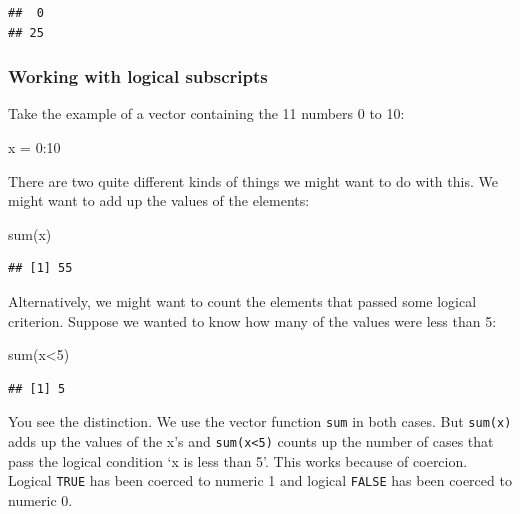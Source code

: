 \documentclass[
]{book}
\newenvironment{Shaded}{\begin{snugshade}}{\end{snugshade}}
\newcommand{\DecValTok}[1]{\textcolor[rgb]{0.00,0.00,0.81}{#1}}
\newcommand{\FunctionTok}[1]{\textcolor[rgb]{0.00,0.00,0.00}{#1}}
\newcommand{\NormalTok}[1]{#1}
\newcommand{\OtherTok}[1]{\textcolor[rgb]{0.56,0.35,0.01}{#1}}
\newcommand{\SpecialCharTok}[1]{\textcolor[rgb]{0.00,0.00,0.00}{#1}}
\theoremstyle{definition}
\theoremstyle{definition}
\theoremstyle{definition}
\theoremstyle{definition}
\theoremstyle{remark}
\begin{document}
\begin{verbatim}
##  0 
## 25
\end{verbatim}

\hypertarget{working-with-logical-subscripts}{%
\subsubsection{Working with logical subscripts}\label{working-with-logical-subscripts}}

Take the example of a vector containing the 11 numbers 0 to 10:

\begin{Shaded}
\begin{Highlighting}[]
\NormalTok{x }\OtherTok{=} \DecValTok{0}\SpecialCharTok{:}\DecValTok{10}
\end{Highlighting}
\end{Shaded}

There are two quite different kinds of things we might want to do with this. We might want to add up the values of the elements:

\begin{Shaded}
\begin{Highlighting}[]
\FunctionTok{sum}\NormalTok{(x)}
\end{Highlighting}
\end{Shaded}

\begin{verbatim}
## [1] 55
\end{verbatim}

Alternatively, we might want to count the elements that passed some logical criterion. Suppose we wanted to know how many of the values were less than 5:

\begin{Shaded}
\begin{Highlighting}[]
\FunctionTok{sum}\NormalTok{(x}\SpecialCharTok{\textless{}}\DecValTok{5}\NormalTok{)}
\end{Highlighting}
\end{Shaded}

\begin{verbatim}
## [1] 5
\end{verbatim}

You see the distinction. We use the vector function \texttt{sum} in both cases. But \texttt{sum(x)} adds up the values of the x's and \texttt{sum(x\textless{}5)} counts up the number of cases that pass the logical condition `x is less than 5'. This works because of coercion. Logical \texttt{TRUE} has been coerced to numeric 1 and logical \texttt{FALSE} has been coerced to numeric 0.
\end{document}
